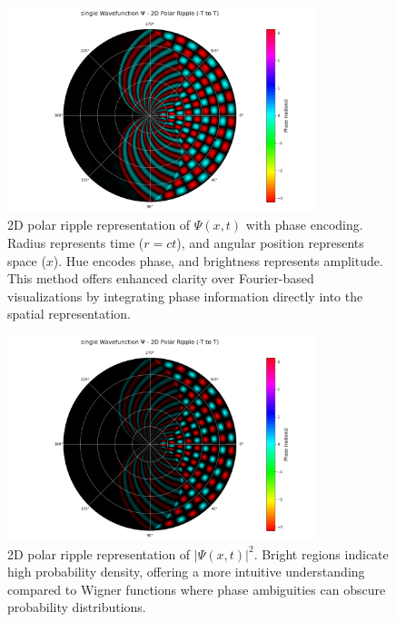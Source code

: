 \documentclass[12pt]{article}
\begin{document}
\begin{figure}[H]
    \centering
    \includegraphics[width=0.8\textwidth]{images/single_wavefunction_2d_polar_with_phase.png}
    \caption{2D polar ripple representation of \(\Psi(x,t)\) with phase encoding. Radius represents time (\(r = ct\)), and angular position represents space (\(x\)). Hue encodes phase, and brightness represents amplitude. This method offers enhanced clarity over Fourier-based visualizations by integrating phase information directly into the spatial representation.}
    \label{fig:single_2d_polar}
\end{figure}

\begin{figure}[H]
    \centering
    \includegraphics[width=0.8\textwidth]{images/single_wavefunction_2d_polar_probability_density_with_phase.png}
    \caption{2D polar ripple representation of \(|\Psi(x,t)|^2\). Bright regions indicate high probability density, offering a more intuitive understanding compared to Wigner functions where phase ambiguities can obscure probability distributions.}
    \label{fig:single_2d_polar_density}
\end{figure}
\end{document}
